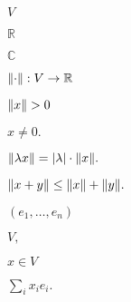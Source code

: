 \documentclass[10pt]{book}
\begin{document}
\begin{mdSnippets}
\newcommand{\R}{\mathbb{R}}
\renewcommand{\C}{\mathbb{C}}
\newcommand{\K}{\mathbb{K}}

\begin{mdInlineSnippet}[5206560a306a2e085a437fd258eb57ce]%
$V$\end{mdInlineSnippet}%
\begin{mdInlineSnippet}%
$\R$\end{mdInlineSnippet}%
\begin{mdInlineSnippet}%
$\C$\end{mdInlineSnippet}%
\begin{mdInlineSnippet}[28ccc849fe12039a9b327310c799214a]%
$\norm{\cdot}: V \to \R$\end{mdInlineSnippet}%
\begin{mdInlineSnippet}%
$\norm{x} > 0$\end{mdInlineSnippet}%
\begin{mdInlineSnippet}[3198651f791aee4036bd038ad164424f]%
$x \ne 0.$\end{mdInlineSnippet}%
\begin{mdInlineSnippet}[76f750fb4d8531580b00d5141c3210d4]%
$\norm{\lambda x} = \left\vert \lambda\right\vert \cdot \norm{x}.$\end{mdInlineSnippet}%
\begin{mdInlineSnippet}%
$\norm{x + y} \le \norm{x} + \norm{y}.$\end{mdInlineSnippet}%
\begin{mdInlineSnippet}[902cf33a7f4382974cf79c09ea369a43]%
$(e_1, \dots, e_n)$\end{mdInlineSnippet}%
\begin{mdInlineSnippet}[a787dbc2f9902096a8fb13903dd63428]%
$V,$\end{mdInlineSnippet}%
\begin{mdInlineSnippet}[829765045ca7f6dcf958e9b3e8238a15]%
$x \in V$\end{mdInlineSnippet}%
\begin{mdInlineSnippet}%
$\sum_i x_i e_i.$\end{mdInlineSnippet}%

\end{mdSnippets}
\end{document}
